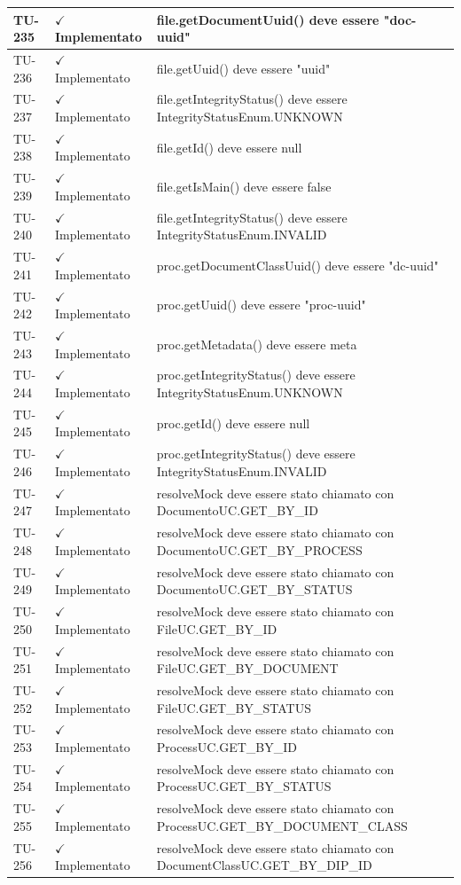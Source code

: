 ﻿\documentclass[a4paper,12pt]{article}
\newcommand{\ok}{\textcolor{green!60!black}{$\checkmark$ Implementato}}
\begin{document}
\begin{longtable}{|p{2cm}|p{3.5cm}|p{9.5cm}|}
\hline
TU-235 & \ok & file.getDocumentUuid() deve essere "doc-uuid" \\
\hline
TU-236 & \ok & file.getUuid() deve essere "uuid" \\
\hline
TU-237 & \ok & file.getIntegrityStatus() deve essere IntegrityStatusEnum.UNKNOWN \\
\hline
TU-238 & \ok & file.getId() deve essere null \\
\hline
TU-239 & \ok & file.getIsMain() deve essere false \\
\hline
TU-240 & \ok & file.getIntegrityStatus() deve essere IntegrityStatusEnum.INVALID \\
\hline
TU-241 & \ok & proc.getDocumentClassUuid() deve essere "dc-uuid" \\
\hline
TU-242 & \ok & proc.getUuid() deve essere "proc-uuid" \\
\hline
TU-243 & \ok & proc.getMetadata() deve essere meta \\
\hline
TU-244 & \ok & proc.getIntegrityStatus() deve essere IntegrityStatusEnum.UNKNOWN \\
\hline
TU-245 & \ok & proc.getId() deve essere null \\
\hline
TU-246 & \ok & proc.getIntegrityStatus() deve essere IntegrityStatusEnum.INVALID \\
\hline
TU-247 & \ok & resolveMock deve essere stato chiamato con DocumentoUC.GET\_BY\_ID \\
\hline
TU-248 & \ok & resolveMock deve essere stato chiamato con DocumentoUC.GET\_BY\_PROCESS \\
\hline
TU-249 & \ok & resolveMock deve essere stato chiamato con DocumentoUC.GET\_BY\_STATUS \\
\hline
TU-250 & \ok & resolveMock deve essere stato chiamato con FileUC.GET\_BY\_ID \\
\hline
TU-251 & \ok & resolveMock deve essere stato chiamato con FileUC.GET\_BY\_DOCUMENT \\
\hline
TU-252 & \ok & resolveMock deve essere stato chiamato con FileUC.GET\_BY\_STATUS \\
\hline
TU-253 & \ok & resolveMock deve essere stato chiamato con ProcessUC.GET\_BY\_ID \\
\hline
TU-254 & \ok & resolveMock deve essere stato chiamato con ProcessUC.GET\_BY\_STATUS \\
\hline
TU-255 & \ok & resolveMock deve essere stato chiamato con ProcessUC.GET\_BY\_DOCUMENT\_CLASS \\
\hline
TU-256 & \ok & resolveMock deve essere stato chiamato con DocumentClassUC.GET\_BY\_DIP\_ID \\

\end{longtable}
\end{document}
